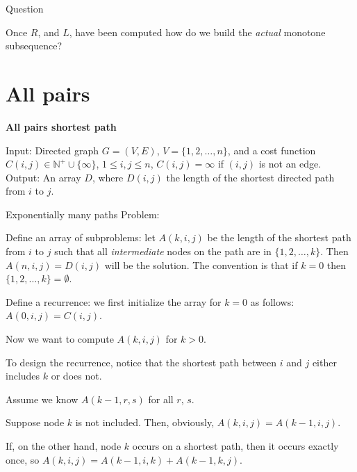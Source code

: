 \begin{frame}
{Question}

Once $R$, and $L$, have been computed how do we build the {\em actual} 
monotone subsequence?
\vfill 
\end{frame}

\section{All pairs}

\begin{frame}
{\bf All pairs shortest path}

Input: Directed graph $G=(V,E)$, $V=\{1,2,\ldots,n\}$, and a cost
function $C(i,j)\in\mathbb{N}^+\cup\{\infty\}$, $1\leq i,j \leq n$,
$C(i,j) = \infty$ if $(i,j)$ is not an edge. \\
Output: An array $D$, where $D(i,j)$ the length of the shortest
directed path from $i$ to $j$.
\end{frame}

\begin{frame}
{Exponentially many paths Problem: \fi}
\begin{center}
\begin{minipage}{6cm}
\end{minipage}
\end{center}
\end{frame}

\begin{frame}
Define an array of subproblems: let $A(k,i,j)$ be the length of the
shortest path from $i$ to $j$ such that all {\em intermediate} nodes
on the path are in $\{1,2,\ldots,k\}$.  Then $A(n,i,j)=D(i,j)$ will be
the solution.  The convention is that if $k=0$ then
$\{1,2,\ldots,k\}=\emptyset$.
\end{frame}

\begin{frame}
Define a recurrence: we first initialize the array for $k=0$ as
follows: $A(0,i,j)=C(i,j)$.

Now we want to compute $A(k,i,j)$ for
$k>0$.

To design the recurrence, notice that the shortest path
between $i$ and $j$ either includes $k$ or does not.

Assume we know
$A(k-1,r,s)$ for all $r$, $s$.

Suppose node $k$ is not included.
Then, obviously, $A(k,i,j)=A(k-1,i,j)$.

If, on the other hand, node
$k$ occurs on a shortest path, then it occurs exactly once, so
$A(k,i,j)=A(k-1,i,k)+ A(k-1,k,j)$.
\end{frame}

